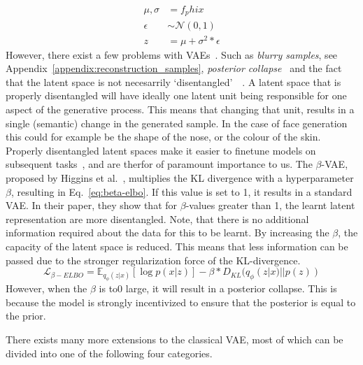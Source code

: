 \begin{equation}
    \begin{split}
        \mu, \sigma & = f_phi{x}                  \\
        \epsilon    & \sim \mathcal{N}(0, 1)      \\
        z           & = \mu + \sigma^2 * \epsilon
    \end{split}
    \label{eq:reparameterization-trick}
\end{equation}
However, there exist a few problems with VAEs~\cite{tomczak2021deep}.
Such as \emph{blurry samples}, see Appendix~\ref{appendix:reconstruction_samples}, \emph{posterior collapse}~\cite{DBLP:journals/corr/BowmanVVDJB15} and the fact that the latent space is not necesarrily `disentangled'~~\cite{higgins2017betavae}. A latent space that is properly disentangled will have ideally one latent unit being responsible for one aspect of the generative process. This means that changing that unit, results in a single (semantic) change in the generated sample. In the case of face generation this could for example be the shape of the nose, or the colour of the skin. Properly disentangled latent spaces make it easier to finetune models on subsequent tasks~\cite{bengio2014representationlearningreviewnew}, and are therfor of paramount importance to us. The $\beta$-VAE, proposed by Higgins et al.~\cite{higgins2017betavae}, multiplies the KL divergence with a hyperparameter $\beta$, resulting in Eq.~\ref{eq:beta-elbo}. If this value is set to 1, it results in a standard VAE. In their paper, they show that for $\beta$-values greater than 1, the learnt latent representation are more disentangled. Note, that there is no additional information required about the data for this to be learnt. By increasing the $\beta$, the capacity of the latent space is reduced. This means that less information can be passed due to the stronger regularization force of the KL-divergence.
\begin{equation}
    \mathcal{L}_{\beta-ELBO} = \mathbb{E}_{q_{\phi}(z|x)}[\log p(x|z)] - \beta * D_{KL}(q_{\phi}(z|x) || p(z))
    \label{eq:beta-elbo}
\end{equation}
However, when the $\beta$ is to0 large, it will result in a posterior collapse. This is because the model is strongly incentivized to ensure that the posterior is equal to the prior.

There exists many more extensions to the classical VAE, most of which can be divided into one of the following four categories.

